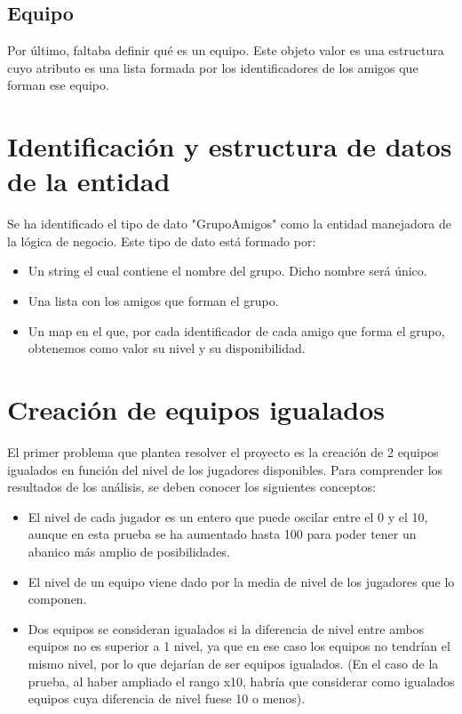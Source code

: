 \subsection{Equipo}

Por último, faltaba definir qué es un equipo. Este objeto valor es una estructura cuyo atributo es una lista formada por los identificadores de los amigos que forman ese equipo.

\section{Identificación y estructura de datos de la entidad}
Se ha identificado el tipo de dato "GrupoAmigos" como la entidad manejadora de la lógica de negocio.
Este tipo de dato está formado por:

\begin{itemize}
    \item Un string el cual contiene el nombre del grupo. Dicho nombre será único.
    \item Una lista con los amigos que forman el grupo.
    \item Un map en el que, por cada identificador de cada amigo que forma el grupo, obtenemos como valor su nivel y su disponibilidad.
\end{itemize}


\section{Creación de equipos igualados}

El primer problema que plantea resolver el proyecto es la creación de 2 equipos igualados en función del nivel de los jugadores disponibles.
Para comprender los resultados de los análisis, se deben conocer los siguientes conceptos:

\begin{itemize}
    \item El nivel de cada jugador es un entero que puede oscilar entre el 0 y el 10, aunque en esta prueba se ha aumentado hasta 100 para poder tener un abanico más amplio de posibilidades.
    \item El nivel de un equipo viene dado por la media de nivel de los jugadores que lo componen.
    \item Dos equipos se consideran igualados si la diferencia de nivel entre ambos equipos no es superior a 1 nivel, ya que en ese caso los equipos no tendrían el mismo nivel, por lo que dejarían de ser equipos igualados.
     (En el caso de la prueba, al haber ampliado el rango x10, habría que considerar como igualados equipos cuya diferencia de nivel fuese 10 o menos).
\end{itemize}

